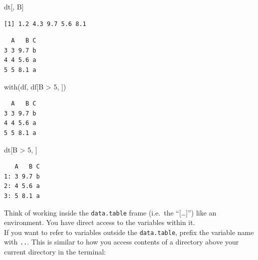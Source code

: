 \documentclass[
]{book}
\newenvironment{Shaded}{\begin{snugshade}}{\end{snugshade}}
\newcommand{\DecValTok}[1]{\textcolor[rgb]{0.00,0.00,0.81}{#1}}
\newcommand{\FunctionTok}[1]{\textcolor[rgb]{0.00,0.00,0.00}{#1}}
\newcommand{\NormalTok}[1]{#1}
\newcommand{\SpecialCharTok}[1]{\textcolor[rgb]{0.00,0.00,0.00}{#1}}
\begin{document}
\begin{Shaded}
\begin{Highlighting}[]
\NormalTok{dt[, B]}
\end{Highlighting}
\end{Shaded}

\begin{verbatim}
[1] 1.2 4.3 9.7 5.6 8.1
\end{verbatim}

\begin{Shaded}
\end{Shaded}

\begin{verbatim}
  A   B C
3 3 9.7 b
4 4 5.6 a
5 5 8.1 a
\end{verbatim}

\begin{Shaded}
\begin{Highlighting}[]
\FunctionTok{with}\NormalTok{(df, df[B }\SpecialCharTok{\textgreater{}} \DecValTok{5}\NormalTok{, ])}
\end{Highlighting}
\end{Shaded}

\begin{verbatim}
  A   B C
3 3 9.7 b
4 4 5.6 a
5 5 8.1 a
\end{verbatim}

\begin{Shaded}
\begin{Highlighting}[]
\NormalTok{dt[B }\SpecialCharTok{\textgreater{}} \DecValTok{5}\NormalTok{, ]}
\end{Highlighting}
\end{Shaded}

\begin{verbatim}
   A   B C
1: 3 9.7 b
2: 4 5.6 a
3: 5 8.1 a
\end{verbatim}

Think of working inside the \texttt{data.table} frame (i.e.~the ``{[}\ldots{]}'') like an environment. You have direct access to the variables within it.\\
If you want to refer to variables outside the \texttt{data.table}, prefix the variable name with \texttt{..}. This is similar to how you access contents of a directory above your current directory in the terminal:
\end{document}
